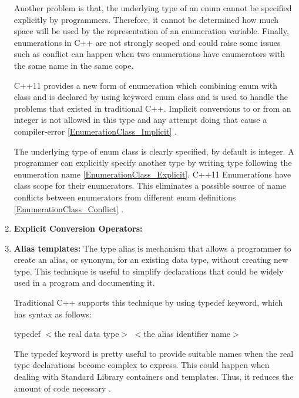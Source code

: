 \documentclass[11pt]{report}
\begin{document}
\begin{enumerate}
Another problem is that, the underlying type of an enum cannot be specified explicitly by programmers. Therefore, it cannot be determined how much space will be used by the representation of an enumeration variable. Finally, enumerations in C++ are not strongly scoped and could raise some issues such as conflict can happen when two enumerations have enumerators with the same name in the same cope\cite{Stroustrup:2012:Cpp11}.
\newline

C++11 provides a new form of enumeration which combining enum with class and is declared by using keyword enum class and is used to handle the problems that existed in traditional C++.  Implicit conversions to or from an integer is not allowed in this type and any attempt doing that cause a compiler-error \ref{EnumerationClass_Implicit} \cite{Overland:2011:CWF}.
\newline

The underlying type of enum class is clearly specified, by default is integer.  A programmer can explicitly specify another type by writing type following the enumeration name \ref{EnumerationClass_Explicit}. C++11 Enumerations have class scope for their enumerators. This eliminates a possible source of name conflicts between enumerators from different enum definitions \ref{EnumerationClass_Conflict} \cite{Josuttis:2012:CppStandard Library}.

\item \textbf{Explicit Conversion Operators:}

\item \textbf{Alias templates:} The type alias is mechanism that allows a programmer to create an alias, or synonym, for an existing data type, without creating new type.  This technique is useful to simplify declarations that could be widely used in a program and documenting it.
\newline

Traditional C++ supports this technique by using typedef keyword, which has syntax as follows:
\begin{center}
 typedef $<$the real data type$>$ $<$the alias identifier name$>$
\end{center}

The typedef keyword is pretty useful to provide suitable names when the real type declarations become complex to express. This could happen when dealing with Standard Library containers and templates. Thus, it reduces the amount of code necessary \cite{Gregorie:professionalcpp}.
\newline


\end{enumerate}
\end{document}

